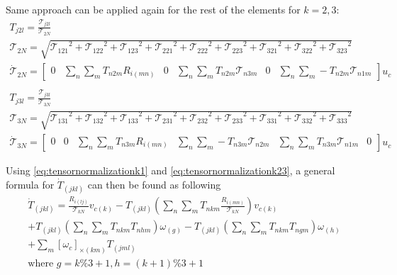Same approach can be applied again for the rest of the elements for $k= 2,3$:
\begin{equation}
  \begin{gathered}
    T_{j2l} = \frac{\mathcal{T}_{j2l}}{\mathcal{T}_{2N}}\\
    \mathcal{T}_{2N} = \sqrt{{\mathcal{T}_{121}}^{2}+{\mathcal{T}_{122}}^{2}+{\mathcal{T}_{123}}^{2}+{\mathcal{T}_{221}}^{2}+{\mathcal{T}_{222}}^{2}+{\mathcal{T}_{223}}^{2}+{\mathcal{T}_{321}}^{2}+{\mathcal{T}_{322}}^{2}+{\mathcal{T}_{323}}^{2} }\\
  \dot{\mathcal{T}}_{2N} = \begin{bmatrix}0 & \sum_n \sum_m T_{n2m}R_{i(mn)} & 0 & \sum_n \sum_m T_{n2m}\mathcal{T}_{n3m} & 0 & \sum_n \sum_m -T_{n2m}\mathcal{T}_{n1m}\end{bmatrix} u_c\\
    \\
    T_{j3l} = \frac{\mathcal{T}_{j3l}}{\mathcal{T}_{3N}}\\
    \mathcal{T}_{3N} = \sqrt{{\mathcal{T}_{131}}^{2}+{\mathcal{T}_{132}}^{2}+{\mathcal{T}_{133}}^{2}+{\mathcal{T}_{231}}^{2}+{\mathcal{T}_{232}}^{2}+{\mathcal{T}_{233}}^{2}+{\mathcal{T}_{331}}^{2}+{\mathcal{T}_{332}}^{2}+{\mathcal{T}_{333}}^{2} }\\
  \dot{\mathcal{T}}_{3N} = \begin{bmatrix}0 & 0 & \sum_n \sum_m T_{n3m}R_{i(mn)}& \sum_n \sum_m -T_{n3m}\mathcal{T}_{n2m}& \sum_n \sum_m T_{n3m}\mathcal{T}_{n1m}& 0\end{bmatrix} u_c
  \end{gathered}\label{eq:tensornormalizationk23}
\end{equation}
\clearpage

Using \eqref{eq:tensornormalizationk1} and \eqref{eq:tensornormalizationk23}, a general formula for $\dot{T}_{(jkl)}$ can then be found as following
\begin{equation}
  \begin{gathered}
    \dot{T}_{(jkl)} = \frac{R_{i(lj)}}{\mathcal{T}_{kN}}v_{c(k)} -T_{(jkl)}(\sum_n \sum_{m}T_{nkm}\frac{R_{i(mn)}}{\mathcal{T}_{kN}}) v_{c(k)}\\ + T_{(jkl)}(\sum_n \sum_{m}T_{nkm}T_{nhm})\omega_{(g)} - T_{(jkl)}(\sum_n \sum_{m}T_{nkm}T_{ngm})\omega_{(h)} \\+\sum_{m} {[\omega_{c}]}_{\times(km)} T_{(jml)}\\
      \text{where } g = k\%3 +1, h = (k+1)\%3 +1
  \end{gathered}\label{eq:tensornormalizationgeneral}
\end{equation}

